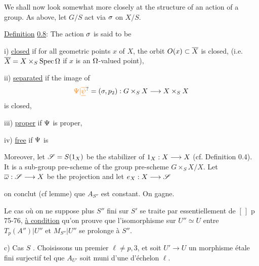  We shall now look somewhat more closely at the structure of an action of a group. As above, let $G/S$ act via $\sigma$ on $X/S$.

\uline{Definition} \uline{0.8}: The action $\sigma$ is said to be

i) \uline{closed} if for all geometric points $x$ of $X$, the orbit $O(x)\subset\overline X$ is closed, (i.e. $\overline X=X\times_S\operatorname{Spec}\Omega$ if $x$ is an $\Omega$-valued point),

ii) \uline{separated} if the image of
\[
\handwritten{\unsure{\Psi|\overline{\underline\psi}}}=(\handwritten{\sigma},p_2):G\times_S X\handwritten{\longrightarrow} X\times_S X
\]
is closed,

iii) \uline{proper} if $\Psi$ is proper,

iv) \uline{free} if $\Psi$ is 

Moreover, let $\mathscr S=S(1_X)$ be the stabilizer of $1_X:X\longrightarrow X$ (cf. Definition 0.4). It is a sub-group pre-scheme of the group pre-scheme $G\times_S X/X$. Let $\overline\omega:\mathscr S\longrightarrow X$ be the projection and let $e_X:X\longrightarrow\mathscr S$


on conclut (cf lemme) que $A_{S''}$ est constant.  On gagne.

Le cas où on ne suppose plus $S''$ fini sur $S'$ se traite par  essentiellement de $[\,]$ p 75-76, \uline{à condition} qu'on prouve que l'isomorphisme sur $U''\simeq U$ entre $T_p(A'')|U''$ et $M_{S''}|U''$ se prolonge à $S''$.  

c) Cas $S$  . Choisissons un  premier $\ell\neq p,3$, et soit $U'\longrightarrow U$ un morphisme étale fini surjectif  tel que $A_{U'}$ soit muni d'une  d'échelon $\ell$.

